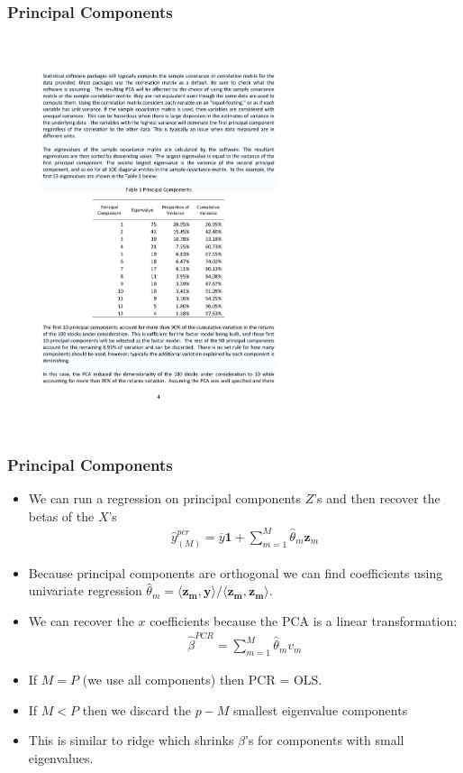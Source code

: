\begin{frame}
\frametitle{Principal Components}
\begin{center}
\includegraphics[width=3.5in]{./resources/princomp2}
\end{center}
\end{frame}

\begin{frame}
\frametitle{Principal Components}
\vspace{-10pt}
\begin{itemize}
\item We can run a regression on principal components $Z$'s and then recover the betas of the $X$'s
\begin{eqnarray*}
\hat{y}_{(M)}^{pcr} = \overline{y} \mathbf{1} + \sum_{m=1}^M \hat{\theta}_m \mathbf{z}_m
\end{eqnarray*}
\item Because principal components are orthogonal we can find coefficients using univariate regression $\hat{\theta}_m = \langle \mathbf{z_m} , \mathbf{y} \rangle / \langle \mathbf{z_m} , \mathbf{z_m} \rangle$.
\item We can recover the $x$ coefficients because the PCA is a linear transformation:
\begin{eqnarray*}
\hat{\beta}^{PCR} = \sum_{m=1}^M \hat{\theta}_m v_m
\end{eqnarray*}
\item If $M=P$ (we use all components) then PCR = OLS.
\item If $M < P$ then we discard the $p-M$ smallest eigenvalue components
\item This is similar to ridge which shrinks $\beta$'s for components with small eigenvalues.
\end{itemize}
\end{frame}


